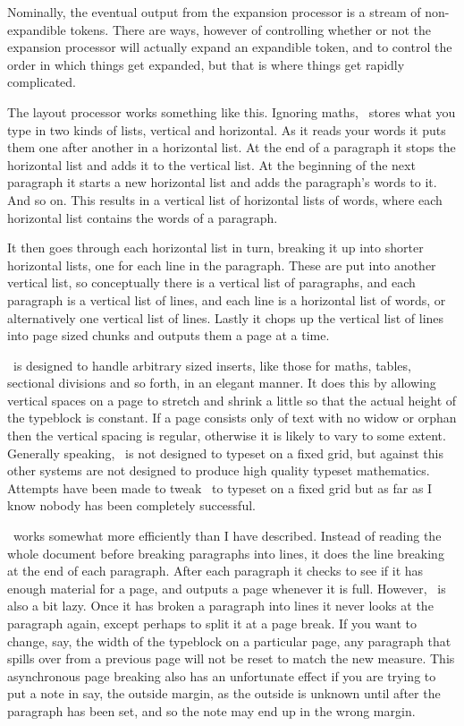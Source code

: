    Nominally, the eventual output from the expansion
processor is a stream of non-expandible tokens. There are ways,
however of controlling whether or not the expansion processor will actually
expand an expandible token, and to control the order in which things
get expanded, but that is where things get rapidly complicated.

    The layout processor works something like this. Ignoring maths,
\tx\ stores what you type in two kinds of lists, vertical and horizontal.
As it reads your words it puts them one after another in a horizontal list.
At the end of a paragraph it stops the horizontal list and adds it to the
vertical list. At the beginning of the next paragraph it starts a new
horizontal list and adds the paragraph's words to it. And so on. This
results in a vertical list of horizontal lists of words, where each 
horizontal list contains the words of a paragraph.

    It then goes through each horizontal list in turn, breaking it up into
shorter horizontal lists, one for each line in the paragraph. These are
put into another vertical list, so conceptually there is a vertical list
of paragraphs, and each paragraph is a vertical list of lines, and each
line is a horizontal list of words, or alternatively one vertical list
of lines. Lastly it chops up the vertical list of lines into page sized 
chunks and outputs them a page at a time.

    \tx\ is designed to handle arbitrary sized inserts, like those for
maths, tables, sectional divisions and so forth, in an elegant manner. 
It does this by allowing
vertical spaces on a page to stretch and shrink a little so that the
actual height of the typeblock is constant. If a page consists only of
text with no widow or orphan then the vertical spacing is regular, otherwise
it is likely to vary to some extent. Generally speaking, \tx\ is not
designed to typeset on a fixed grid, but against this
other systems are not designed
to produce high quality typeset mathematics. Attempts have been made
to tweak \ltx\ to typeset on a fixed grid but as far as I know nobody
has been completely successful.


    \tx\ works somewhat more efficiently than I have described. Instead
of reading the whole document before breaking paragraphs into lines, it 
does the line breaking at the end of each paragraph. After each paragraph
it checks to see if it has enough material for a page, and outputs a page
whenever it is full. However, \tx\ is also a bit lazy. Once it has broken
a paragraph into lines it never looks at the paragraph again, except perhaps
to split it at a page break. If you want to change, say, the width of the
typeblock on a particular page, any paragraph that spills over from a
previous page will not be reset to match the new measure. This asynchronous
page breaking also has an unfortunate effect
if you are trying to put a note in say, the outside margin, as the outside 
is unknown until after the paragraph has been set, and so the note may end
up in the wrong margin.

